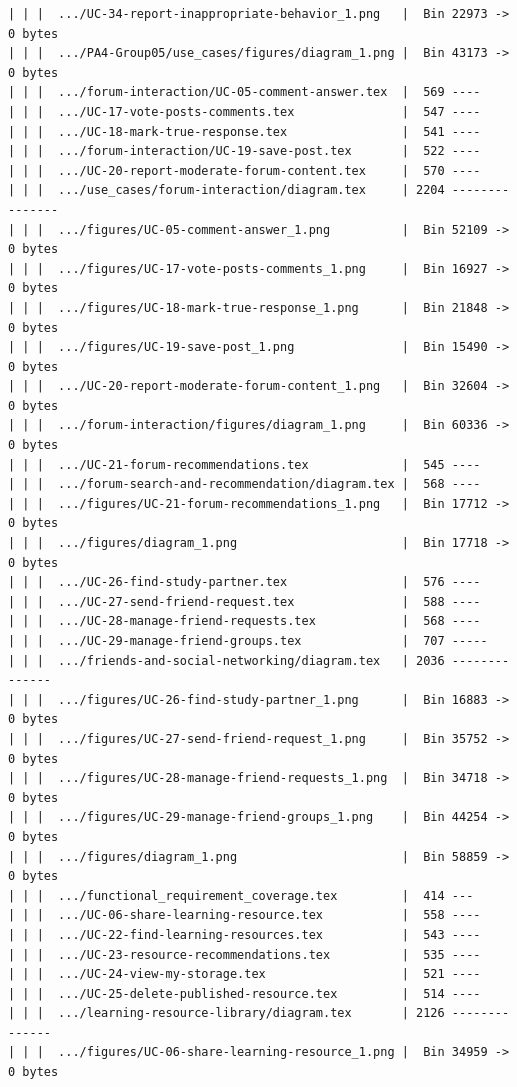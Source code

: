 \documentclass[12pt]{article}
\begin{document}
\begin{lstlisting}[numbers=none,breaklines=true]
| | |  .../UC-34-report-inappropriate-behavior_1.png   |  Bin 22973 -> 0 bytes
| | |  .../PA4-Group05/use_cases/figures/diagram_1.png |  Bin 43173 -> 0 bytes
| | |  .../forum-interaction/UC-05-comment-answer.tex  |  569 ----
| | |  .../UC-17-vote-posts-comments.tex               |  547 ----
| | |  .../UC-18-mark-true-response.tex                |  541 ----
| | |  .../forum-interaction/UC-19-save-post.tex       |  522 ----
| | |  .../UC-20-report-moderate-forum-content.tex     |  570 ----
| | |  .../use_cases/forum-interaction/diagram.tex     | 2204 ---------------
| | |  .../figures/UC-05-comment-answer_1.png          |  Bin 52109 -> 0 bytes
| | |  .../figures/UC-17-vote-posts-comments_1.png     |  Bin 16927 -> 0 bytes
| | |  .../figures/UC-18-mark-true-response_1.png      |  Bin 21848 -> 0 bytes
| | |  .../figures/UC-19-save-post_1.png               |  Bin 15490 -> 0 bytes
| | |  .../UC-20-report-moderate-forum-content_1.png   |  Bin 32604 -> 0 bytes
| | |  .../forum-interaction/figures/diagram_1.png     |  Bin 60336 -> 0 bytes
| | |  .../UC-21-forum-recommendations.tex             |  545 ----
| | |  .../forum-search-and-recommendation/diagram.tex |  568 ----
| | |  .../figures/UC-21-forum-recommendations_1.png   |  Bin 17712 -> 0 bytes
| | |  .../figures/diagram_1.png                       |  Bin 17718 -> 0 bytes
| | |  .../UC-26-find-study-partner.tex                |  576 ----
| | |  .../UC-27-send-friend-request.tex               |  588 ----
| | |  .../UC-28-manage-friend-requests.tex            |  568 ----
| | |  .../UC-29-manage-friend-groups.tex              |  707 -----
| | |  .../friends-and-social-networking/diagram.tex   | 2036 --------------
| | |  .../figures/UC-26-find-study-partner_1.png      |  Bin 16883 -> 0 bytes
| | |  .../figures/UC-27-send-friend-request_1.png     |  Bin 35752 -> 0 bytes
| | |  .../figures/UC-28-manage-friend-requests_1.png  |  Bin 34718 -> 0 bytes
| | |  .../figures/UC-29-manage-friend-groups_1.png    |  Bin 44254 -> 0 bytes
| | |  .../figures/diagram_1.png                       |  Bin 58859 -> 0 bytes
| | |  .../functional_requirement_coverage.tex         |  414 ---
| | |  .../UC-06-share-learning-resource.tex           |  558 ----
| | |  .../UC-22-find-learning-resources.tex           |  543 ----
| | |  .../UC-23-resource-recommendations.tex          |  535 ----
| | |  .../UC-24-view-my-storage.tex                   |  521 ----
| | |  .../UC-25-delete-published-resource.tex         |  514 ----
| | |  .../learning-resource-library/diagram.tex       | 2126 --------------
| | |  .../figures/UC-06-share-learning-resource_1.png |  Bin 34959 -> 0 bytes

\end{lstlisting}
\end{document}
